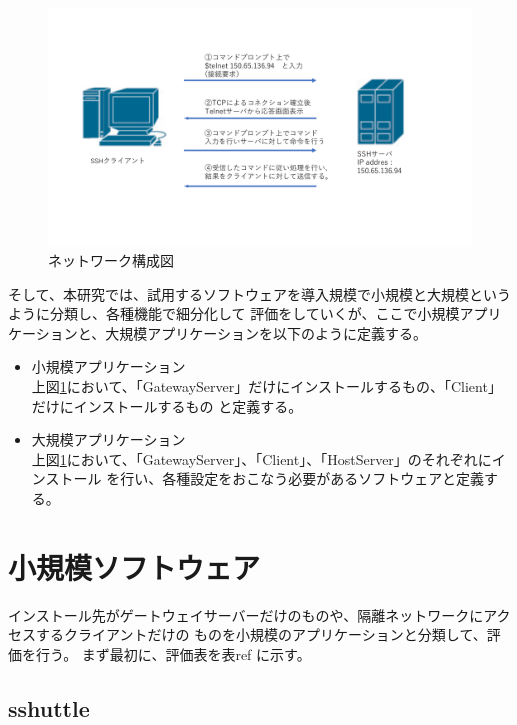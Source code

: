\documentclass[12pt,a4paper,titlepage]{jreport}
\begin{document}
\begin{figure}[H]
    \centering
    \includegraphics*[width=1.0\textwidth,page=2]{graphs/network_archtecture.pdf}
    \caption{ネットワーク構成図}
    \label{network_graph}
\end{figure}



そして、本研究では、試用するソフトウェアを導入規模で小規模と大規模というように分類し、各種機能で細分化して
評価をしていくが、ここで小規模アプリケーションと、大規模アプリケーションを以下のように定義する。
\begin{itemize}
    \item 小規模アプリケーション\mbox{}\\
    上図\ref{network_graph}において、「GatewayServer」だけにインストールするもの、「Client」だけにインストールするもの
    と定義する。
    \item 大規模アプリケーション\mbox{}\\
    上図\ref{network_graph}において、「GatewayServer」、「Client」、「HostServer」のそれぞれにインストール
    を行い、各種設定をおこなう必要があるソフトウェアと定義する。


\end{itemize}


\chapter{小規模ソフトウェア}
インストール先がゲートウェイサーバーだけのものや、隔離ネットワークにアクセスするクライアントだけの
ものを小規模のアプリケーションと分類して、評価を行う。
まず最初に、評価表を表ref に示す。


\section{sshuttle}
\end{document}
